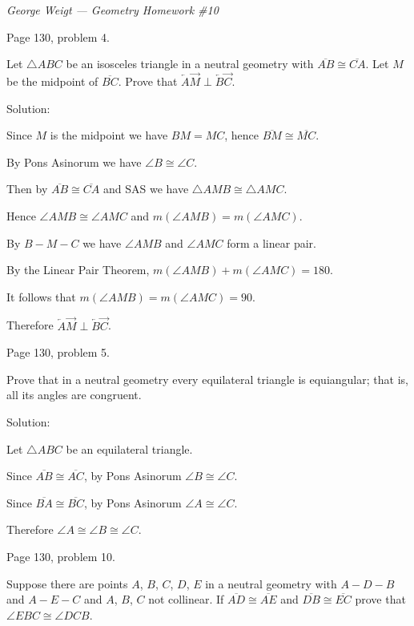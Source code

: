 
\noindent
{\it George Weigt --- Geometry Homework \#10}

\beginsection Page 130, problem 4.

Let $\triangle ABC$ be an isosceles triangle in a neutral geometry
with $\overline{AB}\cong\overline{CA}$.
Let $M$ be the midpoint of $\overline{BC}$.
Prove that $\overleftarrow A\overrightarrow M\perp\overleftarrow B\overrightarrow C$.

\bigskip
\noindent
Solution:

\medskip
Since $M$ is the midpoint we have $BM=MC$, hence $\overline{BM}\cong\overline{MC}$.

\medskip
By Pons Asinorum we have $\angle B\cong\angle C$.

\medskip
Then by $\overline{AB}\cong\overline{CA}$ and SAS we have
$\triangle AMB\cong\triangle AMC$.

\medskip
Hence $\angle AMB\cong\angle AMC$ and $m(\angle AMB)=m(\angle AMC)$.

\medskip
By $B{-}M{-}C$ we have $\angle AMB$ and $\angle AMC$ form a linear pair.

\medskip
By the Linear Pair Theorem, $m(\angle AMB)+m(\angle AMC)=180$.

\medskip
It follows that $m(\angle AMB)=m(\angle AMC)=90$.

\medskip
Therefore $\overleftarrow A\overrightarrow M\perp\overleftarrow B\overrightarrow C$.

\beginsection Page 130, problem 5.

Prove that in a neutral geometry every equilateral triangle is equiangular;
that is, all its angles are congruent.

\bigskip
\noindent
Solution:

\medskip
Let $\triangle ABC$ be an equilateral triangle.

\medskip
Since $\overline{AB}\cong\overline{AC}$, by Pons Asinorum $\angle B\cong\angle C$.

\medskip
Since $\overline{BA}\cong\overline{BC}$, by Pons Asinorum $\angle A\cong\angle C$.

\medskip
Therefore $\angle A\cong\angle B\cong\angle C$.

\beginsection Page 130, problem 10.

Suppose there are points $A$, $B$, $C$, $D$, $E$ in a neutral geometry with
$A{-}D{-}B$ and $A{-}E{-}C$ and $A$, $B$, $C$ not collinear.
If $\overline{AD}\cong\overline{AE}$ and $\overline{DB}\cong\overline{EC}$
prove that $\angle EBC\cong\angle DCB$.

